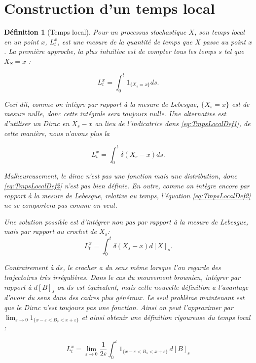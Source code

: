 \documentclass[openany]{book}
\theoremstyle{thmfont}
\theoremstyle{deffont}
\newtheorem{definition}[definition]{Définition}
\theoremstyle{thmfont}
\theoremstyle{deffont}
\begin{document}
\section{Construction d'un temps local}
\begin{definition}[Temps local]
Pour un processus stochastique $X$, son \textit{temps local} en un point $x$, $L_t^x$, est une mesure de la quantité de temps que $X$ passe au point $x$. La première approche, la plus intuitive est de compter tous les temps $s$ tel que $X_S = x$ :

\begin{equation}
  \label{eq:TmpsLocalDef1}
   L^x_t= \int_0^t1_{\{X_s=x\}}ds.
  \end{equation}

  Ceci dit, comme on intègre par rapport à la mesure de Lebesgue, $\{X_s = x\}$ est de mesure nulle, donc cette intégrale sera toujours nulle. Une alternative est d'utiliser un Dirac en $X_s - x$ au lieu de l'indicatrice dans \eqref{eq:TmpsLocalDef1}, de cette manière, nous n'avons plus la 


\begin{equation}
  \label{eq:TmpsLocalDef2}
  L^x_t= \int_0^t\delta(X_s-x)ds.
\end{equation}

Malheureusement, le dirac n'est pas une fonction mais une distribution, donc \eqref{eq:TmpsLocalDef2} n'est pas bien définie. {\color{red} En outre, comme on intègre encore par rapport à la mesure de Lebesgue, relative au temps, l'équation \eqref{eq:TmpsLocalDef2} ne se comportera pas comme on veut.}

Une solution possible est d'intégrer non pas par rapport à la mesure de Lebesgue, mais par rapport au crochet de $X_s$:
\begin{equation}
  \label{eq:TmpsLocalDef3}
  L^x_t= \int_0^t\delta(X_s-x)d[X]_s.
\end{equation}

Contrairement à $ds$, le crocher a du sens même lorsque l’on regarde des trajectoires très irrégulières. Dans le cas du mouvement brownien, intégrer par rapport à $d[B]_s$ ou $ds$ est équivalent, mais cette nouvelle définition a l'avantage d'avoir du sens dans des cadres plus généraux.
Le seul problème maintenant est que le Dirac n'est toujours pas une fonction. Ainsi on peut l'approximer par $\lim_{\varepsilon\to 0}  1_{\{x - \varepsilon < B_s < x + \varepsilon\}}$ et ainsi obtenir une définition rigoureuse du \textit{temps local} :

\begin{equation}
    \label{eq:TmpsLocalDef4}
    { L_t^x = \lim_{\varepsilon \to 0} \frac{1}{2\varepsilon} \int_0^t 1_{\{x - \varepsilon < B_s < x + \varepsilon\}} \, d[B]_s}
\end{equation}
\end{definition}
\end{document}
